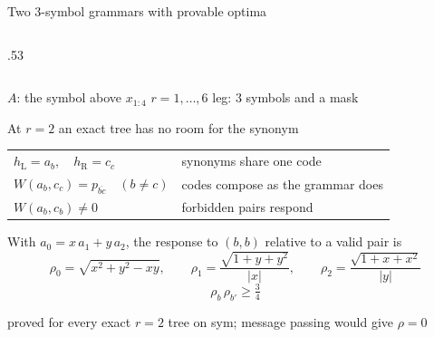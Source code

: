 \documentclass[aspectratio=169,12pt,t]{beamer}
\newcommand{\contextline}[1]{{\par\centering\small\color{secondary}#1\par}}
\newcommand{\sym}{\textsf{sym}}
\begin{document}
\begin{frame}{Two 3-symbol grammars with provable optima}
\begin{columns}[c,onlytextwidth]
\begin{column}{.53\linewidth}
    \end{column}
  \end{columns}
  \vspace{2mm}
  \contextline{$A$: the symbol above $x_{1:4}$ \qquad $r = 1,\dots,6$ \qquad leg: 3 symbols and a mask}
\end{frame}

\begin{frame}{At $r=2$ an exact tree has no room for the synonym}
  \vspace{4mm}
  \centering
  \renewcommand{\arraystretch}{1.5}
  \begin{tabular}{@{}l@{\qquad\quad}l@{}}
    $h_{\mathrm L} = a_b,\quad h_{\mathrm R} = c_{c}$ & synonyms share one code\\
    $W(a_b, c_{c}) = p_{\overline{bc}}\quad (b\neq c)$ & codes compose as the grammar does\\
    $W(a_b, c_b) \neq 0$ & forbidden pairs respond
  \end{tabular}

  \vspace{6mm}
  With $a_0 = x\,a_1 + y\,a_2$, the response to $(b,b)$ relative to a valid pair is
  \[
    \rho_0 = \sqrt{x^2+y^2-xy},\qquad
    \rho_1 = \frac{\sqrt{1+y+y^2}}{|x|},\qquad
    \rho_2 = \frac{\sqrt{1+x+x^2}}{|y|}
  \]
  \[ \rho_b\,\rho_{b'} \ge \tfrac34 \]
  \vspace{1mm}
  \contextline{proved for every exact $r=2$ tree on \sym; message passing would give $\rho = 0$}
\end{frame}
\end{document}

